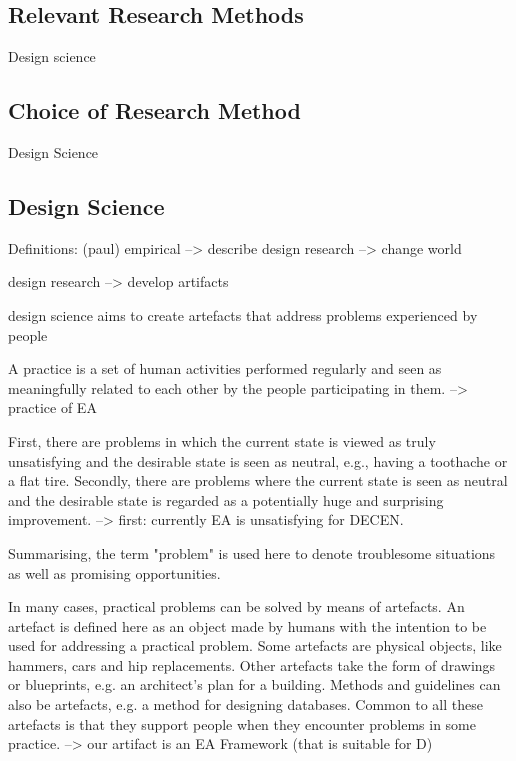 \subsection{Relevant Research Methods}

Design science



\subsection{Choice of Research Method}

Design Science

\subsection{Design Science}

Definitions: (paul)
empirical --> describe
design research --> change world

design research --> develop artifacts

design science aims to create artefacts that address
problems experienced by people

A practice is a set of human activities performed regularly and seen
as meaningfully related to each other by the people participating in
them. --> practice of EA

First, there are problems in which the current state is
viewed as truly unsatisfying and the desirable state is seen as neutral,
e.g., having a toothache or a flat tire. Secondly, there are problems
where the current state is seen as neutral and the desirable
state is regarded as a potentially huge and surprising improvement. --> first: currently EA is unsatisfying for DECEN.

Summarising,
the term "problem" is used here to denote troublesome situations as
well as promising opportunities.

In many cases, practical problems can be solved by means of artefacts.
An artefact is defined here as an object made by humans with the intention to be used for addressing a practical problem. Some
artefacts are physical objects, like hammers, cars and hip replacements. Other artefacts take the form of drawings or blueprints, e.g.
an architect's plan for a building. Methods and guidelines can also be
artefacts, e.g. a method for designing databases. Common to all these
artefacts is that they support people when they encounter problems
in some practice. --> our artifact is an EA Framework (that is suitable for D)

